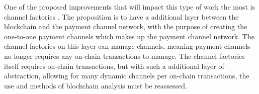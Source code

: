 One of the proposed improvements that will impact this type of work the most is channel factories \cite{burchert2017scalable}.
The proposition is to have a additional layer between the blockchain and the payment channel network, with the purpose of creating the one-to-one payment channels which makes up the payment channel network.
The channel factories on this layer can manage channels, meaning payment channels no longer requires any on-chain transactions to manage.
The channel factories itself requires on-chain transactions, but with such a additional layer of abstraction, allowing for many dynamic channels per on-chain transactions, the use and methods of blockchain analysis must be reassessed.
\\
